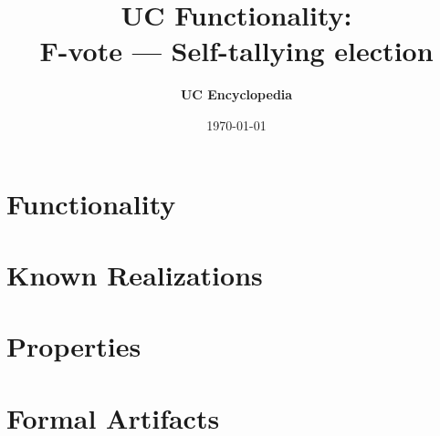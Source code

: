 \documentclass[11pt,a4paper]{article}
\title{\textbf{\Large UC Functionality:}\\[0.2em] \Large F-vote --- Self-tallying election}
\author{\textbf{UC Encyclopedia}}
\date{\today}
\newtheorem{functionality}{Functionality}
\begin{document}
\maketitle

\begin{abstract}
\end{abstract}

\section{Functionality}

%

\section{Known Realizations}


\section{Properties}


\section{Formal Artifacts}

\end{document}
